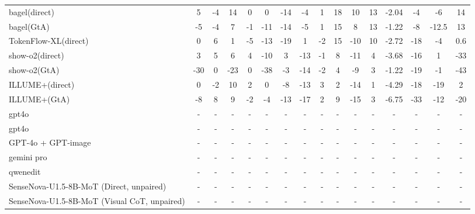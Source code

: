 \documentclass{article}
\providecommand{\rowcolor}[1]{}
\theoremstyle{plain}
\theoremstyle{definition}
\theoremstyle{remark}
\begin{document}
\begin{table}[!htbp]
{\begin{tabular}{@{}lccccccccccccccc@{}}
bagel(direct) & 5 & -4 & 14 & 0 & 0 & -14 & -4 & 1 & 18 & 10 & 13 & -2.04 & -4 & -6 & 14 \\
bagel(GtA) & -5 & -4 & 7 & -1 & -11 & -14 & -5 & 1 & 15 & 8 & 13 & -1.22 & -8 & -12.5 & 13 \\
TokenFlow-XL(direct) & 0 & 6 & 1 & -5 & -13 & -19 & 1 & -2 & 15 & -10 & 10 & -2.72 & -18 & -4 & 0.6 \\
show-o2(direct) & 3 & 5 & 6 & 4 & -10 & 3 & -13 & -1 & 8 & -11 & 4 & -3.68 & -16 & 1 & -33 \\
show-o2(GtA) & -30 & 0 & -23 & 0 & -38 & -3 & -14 & -2 & 4 & -9 & 3 & -1.22 & -19 & -1 & -43 \\
ILLUME+(direct) & 0 & -2 & 10 & 2 & 0 & -8 & -13 & 3 & 2 & -14 & 1 & -4.29 & -18 & -19 & 2 \\
ILLUME+(GtA) & -8 & 8 & 9 & -2 & -4 & -13 & -17 & 2 & 9 & -15 & 3 & -6.75 & -33 & -12 & -20 \\
\midrule
\rowcolor{orange!8}
gpt4o & - & - & - & - & - & - & - & - & - & - & - & - & - & - & - \\
gpt4o & - & - & - & - & - & - & - & - & - & - & - & - & - & - & - \\
\midrule
GPT-4o + GPT-image & - & - & - & - & - & - & - & - & - & - & - & - & - & - & - \\
gemini pro & - & - & - & - & - & - & - & - & - & - & - & - & - & - & - \\
qwenedit & - & - & - & - & - & - & - & - & - & - & - & - & - & - & - \\
SenseNova-U1.5-8B-MoT (Direct, unpaired) & - & - & - & - & - & - & - & - & - & - & - & - & - & - & - \\
SenseNova-U1.5-8B-MoT (Visual CoT, unpaired) & - & - & - & - & - & - & - & - & - & - & - & - & - & - & - \\
\bottomrule
\end{tabular}%
}
\end{table}
\end{document}
